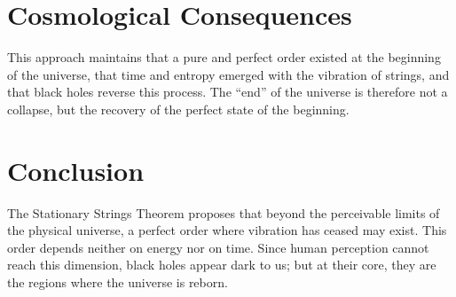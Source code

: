\documentclass[12pt]{article}
\begin{document}
\section{Cosmological Consequences}
This approach maintains that a pure and perfect order existed at the beginning of the universe,
that time and entropy emerged with the vibration of strings,
and that black holes reverse this process.
The ``end'' of the universe is therefore not a collapse,
but the recovery of the perfect state of the beginning.

\section{Conclusion}
The Stationary Strings Theorem proposes that beyond the perceivable limits of the physical universe,
a perfect order where vibration has ceased may exist.
This order depends neither on energy nor on time.
Since human perception cannot reach this dimension, black holes appear dark to us;
but at their core, they are the regions where the universe is reborn.
\end{document}
